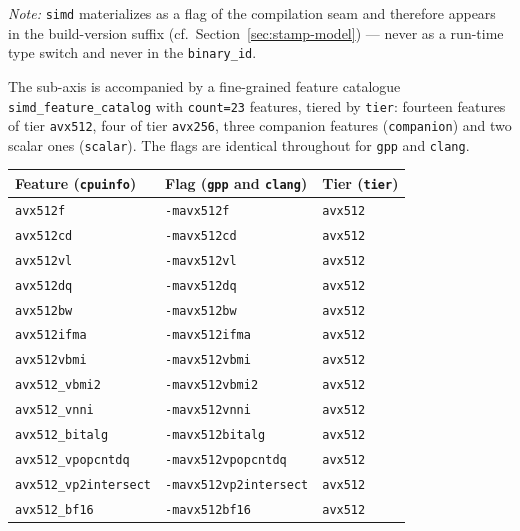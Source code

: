 \emph{Note:} \texttt{simd} materializes as a flag of the compilation seam and therefore appears in the build-version suffix (cf.\ Section~\ref{sec:stamp-model}) --- never as a run-time type switch and never in the \texttt{binary\_\allowbreak{}id}.

The sub-axis is accompanied by a fine-grained feature catalogue \texttt{simd\_\allowbreak{}feature\_\allowbreak{}catalog} with \texttt{count=23} features, tiered by \texttt{tier}: fourteen features of tier \texttt{avx512}, four of tier \texttt{avx256}, three companion features (\texttt{companion}) and two scalar ones (\texttt{scalar}). The flags are identical throughout for \texttt{gpp} and \texttt{clang}.

\begin{scriptsize}
\begin{longtable}{@{}>{\raggedright\arraybackslash}p{4.4cm} >{\raggedright\arraybackslash}p{5.4cm} >{\raggedright\arraybackslash}p{3.7cm}@{}}
\toprule
Feature (\texttt{cpuinfo}) & Flag (\texttt{gpp} and \texttt{clang}) & Tier (\texttt{tier}) \\
\midrule
\endhead%
\texttt{avx512f} & \texttt{-mavx512f} & \texttt{avx512} \\
\texttt{avx512cd} & \texttt{-mavx512cd} & \texttt{avx512} \\
\texttt{avx512vl} & \texttt{-mavx512vl} & \texttt{avx512} \\
\texttt{avx512dq} & \texttt{-mavx512dq} & \texttt{avx512} \\
\texttt{avx512bw} & \texttt{-mavx512bw} & \texttt{avx512} \\
\texttt{avx512ifma} & \texttt{-mavx512ifma} & \texttt{avx512} \\
\texttt{avx512vbmi} & \texttt{-mavx512vbmi} & \texttt{avx512} \\
\texttt{avx512\_\allowbreak{}vbmi2} & \texttt{-mavx512vbmi2} & \texttt{avx512} \\
\texttt{avx512\_\allowbreak{}vnni} & \texttt{-mavx512vnni} & \texttt{avx512} \\
\texttt{avx512\_\allowbreak{}bitalg} & \texttt{-mavx512bitalg} & \texttt{avx512} \\
\texttt{avx512\_\allowbreak{}vpopcntdq} & \texttt{-mavx512vpopcntdq} & \texttt{avx512} \\
\texttt{avx512\_\allowbreak{}vp2intersect} & \texttt{-mavx512vp2intersect} & \texttt{avx512} \\
\texttt{avx512\_\allowbreak{}bf16} & \texttt{-mavx512bf16} & \texttt{avx512} \\

\end{longtable}
\end{scriptsize}
